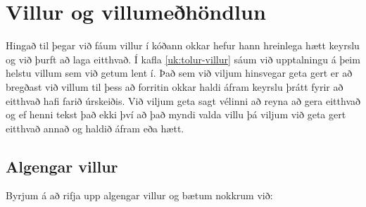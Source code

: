 
\chapter{Villur og villumeðhöndlun}\label{k:villur}
Hingað til þegar við fáum villur í kóðann okkar hefur hann hreinlega hætt keyrslu og við þurft að laga eitthvað.
Í kafla \ref{uk:tolur-villur} sáum við upptalningu á þeim helstu villum sem við getum lent í.
Það sem við viljum hinsvegar geta gert er að bregðast við villum til þess að forritin okkar haldi áfram keyrslu þrátt fyrir að eitthvað hafi farið úrskeiðis.
Við viljum geta sagt vélinni að reyna að gera eitthvað og ef henni tekst það ekki því að það myndi valda villu þá viljum við geta gert eitthvað annað og haldið áfram eða hætt.

\section{Algengar villur}\label{uk:villur-algengar}
Byrjum á að rifja upp algengar villur og bætum nokkrum við:

